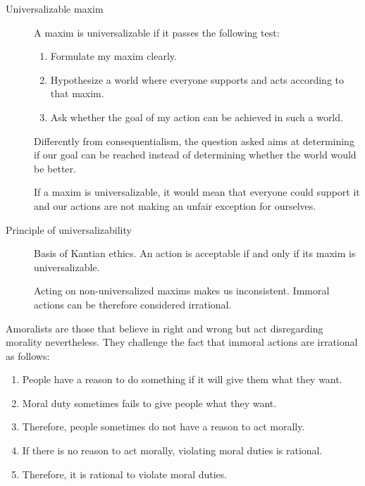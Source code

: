 \begin{description}
    \item[Universalizable maxim] 
        A maxim is universalizable if it passes the following test:
        \begin{enumerate}
            \item Formulate my maxim clearly.
            \item Hypothesize a world where everyone supports and acts according to that maxim.
            \item Ask whether the goal of my action can be achieved in such a world.
        \end{enumerate}

        \begin{remark}
            Differently from consequentialism, the question asked aims at determining if our goal can be reached instead of determining whether the world would be better.
        \end{remark}

        \begin{remark}
            If a maxim is universalizable, it would mean that everyone could support it and our actions are not making an unfair exception for ourselves.
        \end{remark}

    \item[Principle of universalizability] 
        Basis of Kantian ethics. An action is acceptable if and only if its maxim is universalizable.

        Acting on non-universalized maxims makes us inconsistent. Immoral actions can be therefore considered irrational.
\end{description}

\begin{remark}
    Amoralists are those that believe in right and wrong but act disregarding morality nevertheless. They challenge the fact that immoral actions are irrational as follows:
        \begin{enumerate}
            \item People have a reason to do something if it will give them what they want.
            \item Moral duty sometimes fails to give people what they want.
            \item Therefore, people sometimes do not have a reason to act morally.
            \item If there is no reason to act morally, violating moral duties is rational.
            \item Therefore, it is rational to violate moral duties.
        \end{enumerate}
\end{remark}

